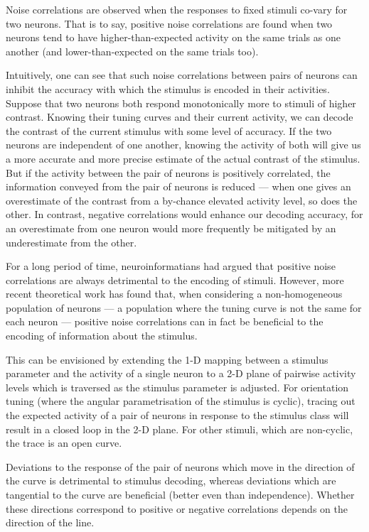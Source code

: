 Noise correlations are observed when the responses to fixed stimuli co-vary for two neurons.
That is to say, positive noise correlations are found when two neurons tend to have higher-than-expected activity on the same trials as one another (and lower-than-expected on the same trials too).

Intuitively, one can see that such noise correlations between pairs of neurons can inhibit the accuracy with which the stimulus is encoded in their activities.
Suppose that two neurons both respond monotonically more to stimuli of higher contrast.
Knowing their tuning curves and their current activity, we can decode the contrast of the current stimulus with some level of accuracy.
If the two neurons are independent of one another, knowing the activity of both will give us a more accurate and more precise estimate of the actual contrast of the stimulus.
But if the activity between the pair of neurons is positively correlated, the information conveyed from the pair of neurons is reduced --- when one gives an overestimate of the contrast from a by-chance elevated activity level, so does the other.
In contrast, negative correlations would enhance our decoding accuracy, for an overestimate from one neuron would more frequently be mitigated by an underestimate from the other.

For a long period of time, neuroinformatians had argued that positive noise correlations are always detrimental to the encoding of stimuli.
However, more recent theoretical work has found that, when considering a non-homogeneous population of neurons --- a population where the tuning curve is not the same for each neuron --- positive noise correlations can in fact be beneficial to the encoding of information about the stimulus.

This can be envisioned by extending the 1-D mapping between a stimulus parameter and the activity of a single neuron to a 2-D plane of pairwise activity levels which is traversed as the stimulus parameter is adjusted.
For orientation tuning (where the angular parametrisation of the stimulus is cyclic), tracing out the expected activity of a pair of neurons in response to the stimulus class will result in a closed loop in the 2-D plane.
For other stimuli, which are non-cyclic, the trace is an open curve.

Deviations to the response of the pair of neurons which move in the direction of the curve is detrimental to stimulus decoding, whereas deviations which are tangential to the curve are beneficial (better even than independence).
Whether these directions correspond to positive or negative correlations depends on the direction of the line.
